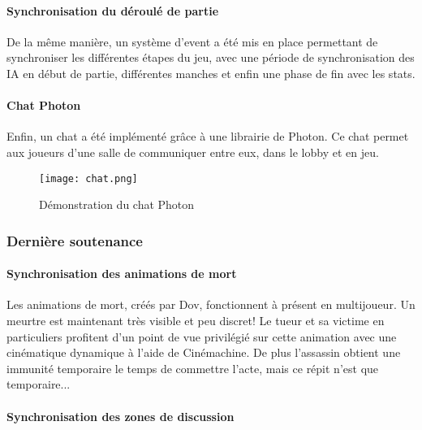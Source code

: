         \paragraph{Synchronisation du déroulé de partie}

            De la même manière, un système d'event a été mis en place permettant de synchroniser les différentes étapes du jeu, 
            avec une période de synchronisation des IA en début de partie, différentes manches et enfin une phase de fin avec les stats.


        \paragraph{Chat Photon}

        Enfin, un chat a été implémenté grâce à une librairie de Photon. Ce chat permet aux joueurs 
        d'une salle de communiquer entre eux, dans le lobby et en jeu.

        \begin{figure}[hbt!]
            \centering
            \texttt{[image: chat.png]}
            \caption{Démonstration du chat Photon}
        \end{figure}

    \vspace{0.5cm}
    \subsubsection{Dernière soutenance}
    \vspace{0.5cm}

        \paragraph{Synchronisation des animations de mort}
			
			Les animations de mort, créés par Dov, fonctionnent à présent en multijoueur. Un meurtre est maintenant très visible et peu discret!
			Le tueur et sa victime en particuliers profitent d'un point de vue privilégié sur cette animation avec une cinématique dynamique à l'aide de Cinémachine.
			De plus l'assassin obtient une immunité temporaire le temps de commettre l'acte, mais ce répit n'est que temporaire...
			
		\paragraph{Synchronisation des zones de discussion}
			
